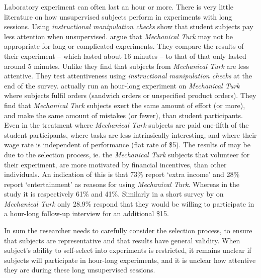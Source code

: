 \documentclass[preprint, 12pt]{elsarticle}
\begin{document}
Laboratory experiment can often last an hour or more. There is very little literature on how unsupervised subjects perform in  experiments with long sessions. Using \emph{instructional manipulation checks} \citet*{Oppenheimer_Meyvis_Davidenko_2009} show that student subjects pay less attention when unsupervised. \cite{Goodman_Cryder_Cheema_2013} argue that \emph{Mechanical Turk} may not be appropriate for long or complicated experiments. They compare the results of their experiment -- which lasted about 16 minutes -- to that of \citet*{Paolacci_Chandler_Ipeirotis_2010} that only lasted around 5 minutes. Unlike \cite{Paolacci_Chandler_Ipeirotis_2010} they find that subjects from \emph{Mechanical Turk} are less attentive. They test attentiveness using \emph{instructional manipulation checks} at the end of the survey. \citet*{Farrell_Grenier_Leiby_2014} actually run an hour-long experiment on \emph{Mechanical Turk} where subjects fulfil orders (sandwich orders or unspecified product orders). They find that \emph{Mechanical Turk} subjects exert the same amount of effort (or more), and make the same amount of mistakes (or fewer), than student participants. Even in the treatment where \emph{Mechanical Turk} subjects are paid one-fifth of the student participants, where tasks are less intrinsically interesting, and where their wage rate is independent of performance (flat rate of \$5). The results of \cite{Farrell_Grenier_Leiby_2014} may be due to the selection process, ie. the \emph{Mechanical Turk} subjects that volunteer for their experiment, are more motivated by financial incentives, than other individuals. An indication of this is that 73\% report `extra income' and 28\% report `entertainment' as reasons for using \emph{Mechanical Turk}. Whereas in the \cite{Paolacci_Chandler_Ipeirotis_2010} study it is respectively 61\% and 41\%. Similarly in a short survey by \cite{Williamson_2014} on \emph{Mechanical Turk} only 28.9\% respond that they would be willing to participate in a hour-long follow-up interview for an additional \$15.

In sum the researcher needs to carefully consider the selection process, to ensure that subjects are representative and that results have general validity. When subject's ability to self-select into experiments is restricted, it remains unclear if subjects will participate in hour-long experiments, and it is unclear how attentive they are during these long unsupervised sessions.
\end{document}
